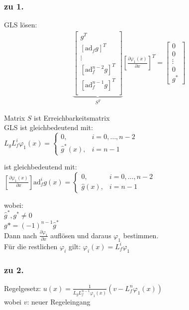 \documentclass[6pt,a4paper,fleqn]{scrartcl}
\begin{document}
\begin{multicols*}{4}
\subsubsection*{zu 1.}
GLS lösen: \\
\begin{align*}
  \underbrace{
  \begin{bmatrix}
    g^T \\
    [\text{ad}_f g]^T \\
    \vdots \\
    [\text{ad}^{n-2}_f g]^T \\
    [\text{ad}^{n-1}_f g]^T \\
  \end{bmatrix}
  }_{S^T}
  \left[ \frac{\partial \varphi_1(x)}{\partial x} \right]^T
  =
  \begin{bmatrix}
    0 \\
    0 \\
    \vdots \\
    0 \\
    g^*
  \end{bmatrix}
\end{align*}

Matrix $S$ ist Erreichbarkeitsmatrix \\

GLS ist gleichbedeutend mit: \\
$ L_g L_f^i \varphi_1(x) =
\begin{cases}
  0, & i = 0, \dots, n-2 \\
  \hat{g}^*(x), & i = n-1
\end{cases}$

ist gleichbedeutend mit: \\
$\left[ \frac{\partial \varphi_1(x)}{\partial x} \right] \text{ad}_f^i g(x) = 
\begin{cases}
  0, & i = 0, \dots, n-2 \\
  \hat{g}(x), & i = n-1
\end{cases}$

wobei:\\
$\hat{g}^*, g^* \neq 0$ \\
$g* = (-1)^{n-1} \hat{g}^*$\\

Dann nach $\frac{\partial \varphi_1}{\partial x}$ auflösen und daraus $\varphi_1$ bestimmen. \\
Für die restlichen $\varphi_i$ gilt: $\varphi_i(x) = L_f^i \varphi_1$

\subsubsection*{zu 2.}
Regelgesetz: $u(x) = \frac{1}{L_g L_f^{n-1} \varphi_1(x)} \left( v - L_f^n \varphi_1(x) \right)$\\
wobei $v$: neuer Regeleingang




\end{multicols*}
\end{document}
